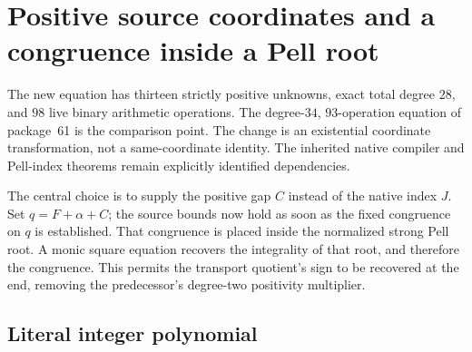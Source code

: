 \section{Positive source coordinates and a congruence inside a Pell root}
\label{sec:positive-coordinate-carrier}

The new equation has thirteen strictly positive unknowns, exact total degree
$28$, and $98$ live binary arithmetic operations.  The degree-$34$,
$93$-operation equation of package~61 is the comparison point.  The change
is an existential coordinate transformation, not a same-coordinate identity.
The inherited native compiler and Pell-index theorems remain explicitly
identified dependencies.

The central choice is to supply the positive gap $C$ instead of the native
index $J$.  Set $q=F+\alpha+C$; the source bounds now hold as soon as the
fixed congruence on $q$ is established.  That congruence is placed inside
the normalized strong Pell root.  A monic square equation recovers the
integrality of that root, and therefore the congruence.  This permits the
transport quotient's sign to be recovered at the end, removing the
predecessor's degree-two positivity multiplier.

\subsection{Literal integer polynomial}

